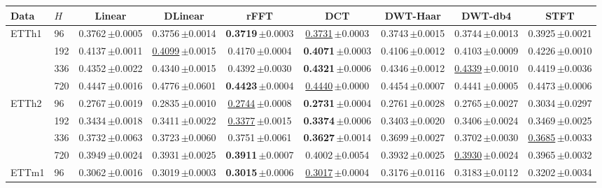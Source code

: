 \begin{tabular}{llccccccc}
\toprule
\textbf{Data} & $H$ & \textbf{Linear} & \textbf{DLinear} & \textbf{rFFT} & \textbf{DCT} & \textbf{DWT-Haar} & \textbf{DWT-db4} & \textbf{STFT} \\
\midrule
\multirow{4}{*}{ETTh1} & 96 & 0.3762\,{\tiny$\pm$0.0005} & 0.3756\,{\tiny$\pm$0.0014} & \textbf{0.3719}\,{\tiny$\pm$0.0003} & \underline{0.3731}\,{\tiny$\pm$0.0003} & 0.3743\,{\tiny$\pm$0.0015} & 0.3744\,{\tiny$\pm$0.0013} & 0.3925\,{\tiny$\pm$0.0021} \\
 & 192 & 0.4137\,{\tiny$\pm$0.0011} & \underline{0.4099}\,{\tiny$\pm$0.0015} & 0.4170\,{\tiny$\pm$0.0004} & \textbf{0.4071}\,{\tiny$\pm$0.0003} & 0.4106\,{\tiny$\pm$0.0012} & 0.4103\,{\tiny$\pm$0.0009} & 0.4226\,{\tiny$\pm$0.0010} \\
 & 336 & 0.4352\,{\tiny$\pm$0.0022} & 0.4340\,{\tiny$\pm$0.0015} & 0.4392\,{\tiny$\pm$0.0030} & \textbf{0.4321}\,{\tiny$\pm$0.0006} & 0.4346\,{\tiny$\pm$0.0012} & \underline{0.4339}\,{\tiny$\pm$0.0010} & 0.4419\,{\tiny$\pm$0.0036} \\
 & 720 & 0.4447\,{\tiny$\pm$0.0016} & 0.4776\,{\tiny$\pm$0.0601} & \textbf{0.4423}\,{\tiny$\pm$0.0004} & \underline{0.4440}\,{\tiny$\pm$0.0000} & 0.4454\,{\tiny$\pm$0.0007} & 0.4441\,{\tiny$\pm$0.0005} & 0.4473\,{\tiny$\pm$0.0006} \\
\midrule
\multirow{4}{*}{ETTh2} & 96 & 0.2767\,{\tiny$\pm$0.0019} & 0.2835\,{\tiny$\pm$0.0010} & \underline{0.2744}\,{\tiny$\pm$0.0008} & \textbf{0.2731}\,{\tiny$\pm$0.0004} & 0.2761\,{\tiny$\pm$0.0028} & 0.2765\,{\tiny$\pm$0.0027} & 0.3034\,{\tiny$\pm$0.0297} \\
 & 192 & 0.3434\,{\tiny$\pm$0.0018} & 0.3411\,{\tiny$\pm$0.0022} & \underline{0.3377}\,{\tiny$\pm$0.0015} & \textbf{0.3374}\,{\tiny$\pm$0.0006} & 0.3403\,{\tiny$\pm$0.0020} & 0.3406\,{\tiny$\pm$0.0024} & 0.3469\,{\tiny$\pm$0.0025} \\
 & 336 & 0.3732\,{\tiny$\pm$0.0063} & 0.3723\,{\tiny$\pm$0.0060} & 0.3751\,{\tiny$\pm$0.0061} & \textbf{0.3627}\,{\tiny$\pm$0.0014} & 0.3699\,{\tiny$\pm$0.0027} & 0.3702\,{\tiny$\pm$0.0030} & \underline{0.3685}\,{\tiny$\pm$0.0033} \\
 & 720 & 0.3949\,{\tiny$\pm$0.0024} & 0.3931\,{\tiny$\pm$0.0025} & \textbf{0.3911}\,{\tiny$\pm$0.0007} & 0.4002\,{\tiny$\pm$0.0054} & 0.3932\,{\tiny$\pm$0.0025} & \underline{0.3930}\,{\tiny$\pm$0.0024} & 0.3965\,{\tiny$\pm$0.0032} \\
\midrule
\multirow{4}{*}{ETTm1} & 96 & 0.3062\,{\tiny$\pm$0.0016} & 0.3019\,{\tiny$\pm$0.0003} & \textbf{0.3015}\,{\tiny$\pm$0.0006} & \underline{0.3017}\,{\tiny$\pm$0.0004} & 0.3176\,{\tiny$\pm$0.0116} & 0.3183\,{\tiny$\pm$0.0112} & 0.3202\,{\tiny$\pm$0.0034} \\

\end{tabular}
